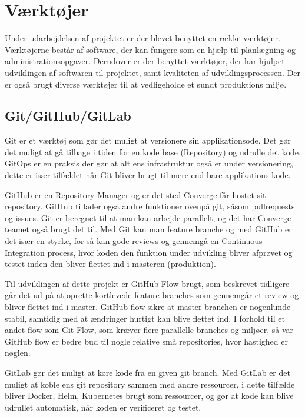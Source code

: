 \section{Værktøjer}

Under udarbejdelsen af projektet er der blevet benyttet en række værktøjer. Værktøjerne består af software, der kan fungere som en hjælp til planlægning og administrationsopgaver. Derudover er der benyttet værktøjer, der har hjulpet udviklingen af softwaren til projektet, samt kvaliteten af udviklingsprocessen. Der er også brugt diverse værktøjer til at vedligeholde et sundt produktions miljø.

\subsection{Git/GitHub/GitLab}

Git er et værktøj som gør det muligt at versionere sin applikationsode. Det gør det muligt at gå tilbage i tiden for en kode base (Repository) og udrulle det kode. GitOps er en praksis der gør at alt ens infrastruktur også er under versionering, dette er især tilfældet når Git bliver brugt til mere end bare applikations kode.

GitHub er en Repository Manager og er det sted Converge får hostet sit repository. GitHub tillader også andre funktioner ovenpå git, såsom pullrequests og issues. Git er beregnet til at man kan arbejde parallelt, og det har Converge-teamet også brugt det til. Med Git kan man feature branche og med GitHub er det især en styrke, for så kan gode reviews og gennemgå en Continuous Integration process, hvor koden den funktion under udvikling bliver afprøvet og testet inden den bliver flettet ind i masteren (produktion).

Til udviklingen af dette projekt er GitHub Flow brugt, som beskrevet tidligere går det ud på at oprette kortlevede feature branches som gennemgår et review og bliver flettet ind i master. GitHub flow sikre at master branchen er nogenlunde stabil, samtidig med at ændringer hurtigt kan blive flettet ind. I forhold til et andet flow som Git Flow, som kræver flere parallelle branches og miljøer, så var GitHub flow er bedre bud til nogle relative små repositories, hvor hastighed er nøglen.

GitLab gør det muligt at køre kode fra en given git branch. Med GitLab er det muligt at koble ens git repository sammen med andre ressourcer, i dette tilfælde bliver Docker, Helm, Kubernetes brugt som ressourcer, og gør at kode kan blive udrullet automatisk, når koden er verificeret og testet.


